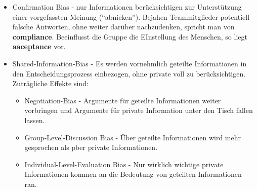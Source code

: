 \begin{itemize}
    \item Confirmation Bias - nur Informationen berücksichtigen zur
        Unterstützung einer vorgefassten Meinung (``abnicken''). Bejahen
        Teammitglieder potentiell falsche Antworten, ohne weiter darüber
        nachzudenken, spricht man von \textbf{compliance}. Beeinflusst
        die Gruppe die EInstellung des Menschen, so liegt
        \textbf{aaceptance} vor.
    \item Shared-Information-Bias - Es werden vornehmlich geteilte Informationen
        in den Entscheidungsprozess einbezogen, ohne private voll zu
        berücksichtigen. Zuträgliche Effekte sind:
        \begin{itemize}
            \item Negotiation-Bias - Argumente für geteilte Informationen
                weiter vorbringen und Argumente für private Information unter
                den Tisch fallen lassen.
            \item Group-Level-Discussion Bias - Über geteilte Informationen wird
                mehr gesprochen als pber private Informationen.
            \item Individual-Level-Evaluation Bias - Nur wirklich wichtige
                private Informationen kommen an die Bedeutung von geteilten
                Informationen ran.
        \end{itemize}
\end{itemize}
